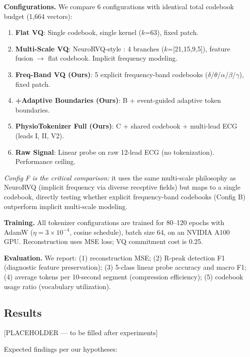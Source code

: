 \documentclass[letterpaper]{article}
\begin{document}
\textbf{Configurations.} We compare 6 configurations with identical total
codebook budget (1,664 vectors):

\begin{enumerate}
    \item[A.] \textbf{Flat VQ}: Single codebook, single kernel ($k$=63), fixed patch.
    \item[F.] \textbf{Multi-Scale VQ}: NeuroRVQ-style \cite{barmpas2025neurorvq}: 4 branches
    ($k$=[21,15,9,5]), feature fusion $\rightarrow$ flat codebook. Implicit
    frequency modeling.
    \item[B.] \textbf{Freq-Band VQ (Ours)}: 5 explicit frequency-band codebooks
    ($\delta$/$\theta$/$\alpha$/$\beta$/$\gamma$), fixed patch.
    \item[C.] \textbf{+Adaptive Boundaries (Ours)}: B + event-guided adaptive
    token boundaries.
    \item[D.] \textbf{PhysioTokenizer Full (Ours)}: C + shared codebook +
    multi-lead ECG (leads I, II, V2).
    \item[E.] \textbf{Raw Signal}: Linear probe on raw 12-lead ECG (no
    tokenization). Performance ceiling.
\end{enumerate}

\textit{Config F is the critical comparison:} it uses the same multi-scale
philosophy as NeuroRVQ (implicit frequency via diverse receptive fields) but
maps to a single codebook, directly testing whether explicit frequency-band
codebooks (Config B) outperform implicit multi-scale modeling.

\textbf{Training.} All tokenizer configurations are trained for 80--120 epochs
with AdamW ($\eta=3\times10^{-4}$, cosine schedule), batch size 64, on an
NVIDIA A100 GPU. Reconstruction uses MSE loss; VQ commitment cost is 0.25.

\textbf{Evaluation.} We report: (1) reconstruction MSE; (2) R-peak detection
F1 (diagnostic feature preservation); (3) 5-class linear probe accuracy and
macro F1; (4) average tokens per 10-second segment (compression efficiency);
(5) codebook usage ratio (vocabulary utilization).

\subsection{Results}

[PLACEHOLDER — to be filled after experiments]

Expected findings per our hypotheses:
\end{document}
